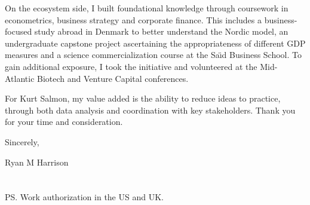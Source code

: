 \documentclass{../res}
\begin{document}
\begin{sloppypar}
\begin{resume}
On the ecosystem side, I built foundational knowledge through coursework in econometrics, business strategy and corporate finance. This includes a business-focused study abroad in Denmark to better understand the Nordic model, an undergraduate capstone project ascertaining the appropriateness of different GDP measures and a science commercialization course at the Sa\"\i d Business School. To gain additional exposure, I took the initiative and volunteered at the Mid-Atlantic Biotech and Venture Capital conferences.



For Kurt Salmon, my value added is the ability to reduce ideas to practice, through both data analysis and coordination with key stakeholders. Thank you for your time and consideration.



\vspace{1\baselineskip}
Sincerely,
\vspace{2\baselineskip}

Ryan M Harrison \\ \\ \\
PS. Work authorization in the US and UK.

\end{resume} 
\end{sloppypar}
\end{document}
